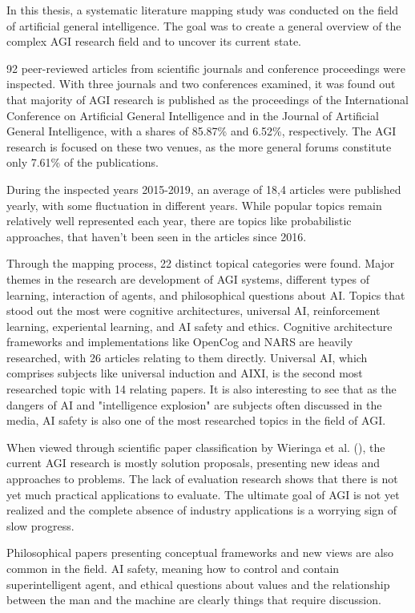 \documentclass[utf8,english]{gradu3}
\begin{document}
In this thesis, a systematic literature mapping study was conducted on the field
of artificial general intelligence. The goal was to create a general overview of
the complex AGI research field and to uncover its current state. 

92 peer-reviewed articles from scientific journals and conference proceedings
were inspected. With three journals and two conferences examined, it was found
out that majority of AGI research is published as the proceedings of the
International Conference on Artificial General Intelligence and in the Journal
of Artificial General Intelligence, with a shares of 85.87\% and 6.52\%,
respectively. The AGI research is focused on these two venues, as the more
general forums constitute only 7.61\% of the publications.

During the inspected years 2015-2019, an average of 18,4 articles were published
yearly, with some fluctuation in different years. While popular topics remain
relatively well represented each year, there are topics like probabilistic
approaches, that haven't been seen in the articles since 2016.

Through the mapping process, 22 distinct topical categories were found. Major
themes in the research are development of AGI systems, different types of
learning, interaction of agents, and philosophical questions about AI. Topics
that stood out the most were cognitive architectures, universal AI,
reinforcement learning, experiental learning, and AI safety and ethics.
Cognitive architecture frameworks and implementations like OpenCog and NARS are
heavily researched, with 26 articles relating to them directly. Universal AI,
which comprises subjects like universal induction and AIXI, is the second most
researched topic with 14 relating papers. It is also interesting to see that as
the dangers of AI and "intelligence explosion" are subjects often discussed in
the media, AI safety is also one of the most researched topics in the field of
AGI.

When viewed through scientific paper classification by Wieringa et al.
(\cite{wieringa2006}), the current AGI research is mostly solution proposals,
presenting new ideas and approaches to problems. The lack of evaluation research
shows that there is not yet much practical applications to evaluate. The
ultimate goal of AGI is not yet realized and the complete absence of industry
applications is a worrying sign of slow progress.

Philosophical papers presenting conceptual frameworks and new views are also
common in the field. AI safety, meaning how to control and contain
superintelligent agent, and ethical questions about values and the relationship
between the man and the machine are clearly things that require discussion.
\end{document}
